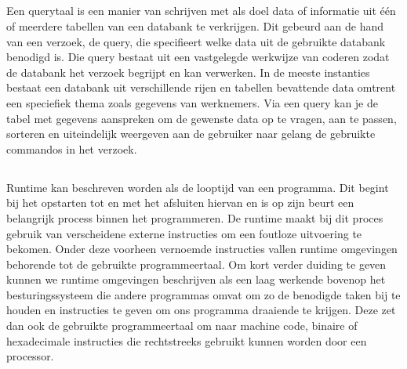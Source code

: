 \subsection{}%
\label{sec:Querytaal}
Een querytaal is een manier van schrijven met als doel data of informatie uit één of meerdere tabellen van een databank te verkrijgen.
Dit gebeurd aan de hand van een verzoek, de query, die specifieert welke data uit de gebruikte databank benodigd is. Die query bestaat uit een vastgelegde werkwijze van coderen zodat de databank het verzoek begrijpt en kan verwerken. In de meeste instanties bestaat een databank uit verschillende rijen en tabellen bevattende data omtrent een speciefiek thema zoals gegevens van werknemers. Via een query kan je de tabel met gegevens aanspreken om de gewenste data op te vragen, aan te passen, sorteren en uiteindelijk weergeven aan de gebruiker naar gelang de gebruikte commandos in het verzoek.

\subsection{}%
\label{sec:Runtime}
Runtime kan beschreven worden als de looptijd van een programma. Dit begint bij het opstarten tot en met het afsluiten hiervan en is op zijn beurt een belangrijk process binnen het programmeren. De runtime maakt bij dit proces gebruik van verscheidene externe instructies om een foutloze uitvoering te bekomen. Onder deze voorheen vernoemde instructies vallen runtime omgevingen behorende tot de gebruikte programmeertaal. Om kort verder duiding te geven kunnen we runtime omgevingen beschrijven als een laag werkende bovenop het besturingssysteem die andere programmas omvat om zo de benodigde taken bij te houden en instructies te geven om ons programma draaiende te krijgen. Deze zet dan ook de gebruikte programmeertaal om naar machine code, binaire of hexadecimale instructies die rechtstreeks gebruikt kunnen worden door een processor.

